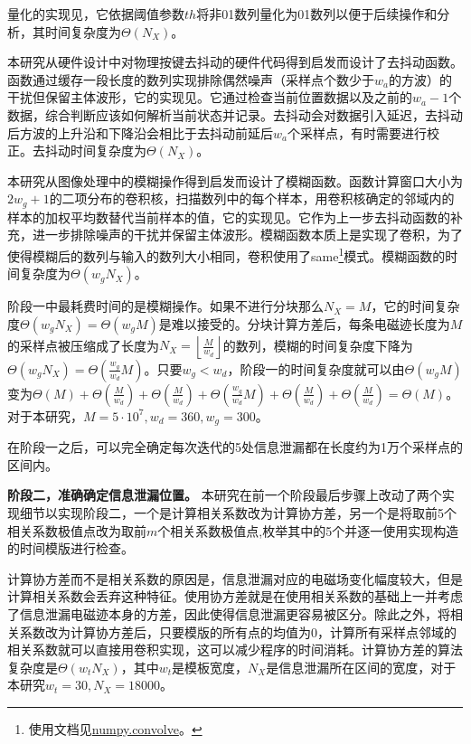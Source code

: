 {	量化的实现见，它依据阈值参数$th$将非01数列量化为01数列以便于后续操作和分析，其时间复杂度为$\Theta(N_X)$。
	
	本研究从硬件设计中对物理按键去抖动的硬件代码得到启发而设计了去抖动函数。函数通过缓存一段长度的数列实现排除偶然噪声（采样点个数少于$w_a$的方波）的干扰但保留主体波形，它的实现见。它通过检查当前位置数据以及之前的$w_a-1$个数据，综合判断应该如何解析当前状态并记录。去抖动会对数据引入延迟，去抖动后方波的上升沿和下降沿会相比于去抖动前延后$w_a$个采样点，有时需要进行校正。去抖动时间复杂度为$\Theta(N_X)$。
	
	本研究从图像处理中的模糊操作得到启发而设计了模糊函数。函数计算窗口大小为$2w_g+1$的二项分布的卷积核，扫描数列中的每个样本，用卷积核确定的邻域内的样本的加权平均数替代当前样本的值，它的实现见。它作为上一步去抖动函数的补充，进一步排除噪声的干扰并保留主体波形。模糊函数本质上是实现了卷积，为了使得模糊后的数列与输入的数列大小相同，卷积使用了same\footnote{使用文档见\href{https://numpy.org/doc/stable/reference/generated/numpy.convolve.html}{numpy.convolve}。}模式。模糊函数的时间复杂度为$\Theta(w_gN_X)$。

	阶段一中最耗费时间的是模糊操作。如果不进行分块那么$N_X=M$，它的时间复杂度$\Theta(w_gN_X)=\Theta(w_gM)$是难以接受的。分块计算方差后，每条电磁迹长度为$M$的采样点被压缩成了长度为$N_X=\left\lfloor\frac{M}{w_d}\right\rfloor$的数列，模糊的时间复杂度下降为$\Theta(w_gN_X)=\Theta(\frac{w_g}{w_d}M)$。只要$w_g<w_d$，阶段一的时间复杂度就可以由$\Theta\left( w_gM\right) $变为$\Theta(M)+\Theta\left( \frac{M}{w_d}\right) +\Theta\left( \frac{M}{w_d}\right) +\Theta\left( \frac{w_g}{w_d}M\right) +\Theta\left( \frac{M}{w_d}\right) +\Theta\left( \frac{M}{w_d}\right) =\Theta(M)$。对于本研究，$M=5\cdot10^7,w_d=360,w_g=300$。
	
	在阶段一之后，可以完全确定每次迭代的5处信息泄漏都在长度约为1万个采样点的区间内。%
	
	\textbf{阶段二，准确确定信息泄漏位置。}
	本研究在前一个阶段最后步骤上改动了两个实现细节以实现阶段二，一个是计算相关系数改为计算协方差，另一个是将取前5个相关系数极值点改为取前$m$个相关系数极值点,枚举其中的5个并逐一使用实现构造的时间模版进行检查。
	
	计算协方差而不是相关系数的原因是，信息泄漏对应的电磁场变化幅度较大，但是计算相关系数会丢弃这种特征。使用协方差就是在使用相关系数的基础上一并考虑了信息泄漏电磁迹本身的方差，因此使得信息泄漏更容易被区分。除此之外，将相关系数改为计算协方差后，只要模版的所有点的均值为0，计算所有采样点邻域的相关系数就可以直接用卷积实现，这可以减少程序的时间消耗。计算协方差的算法复杂度是$\Theta(w_tN_X)$，其中$w_t$是模板宽度，$N_X$是信息泄漏所在区间的宽度，对于本研究$w_t=30,N_X=18000$。
	
}
